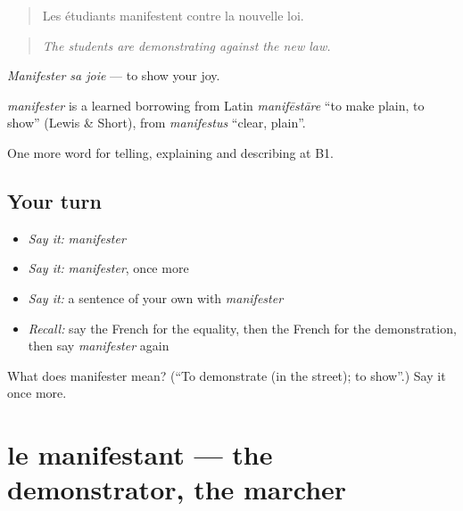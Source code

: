 \begin{quote}
Les étudiants manifestent contre la nouvelle loi.
\end{quote}

\begin{quote}
\emph{The students are demonstrating against the new law.}
\end{quote}

\emph{Manifester sa joie} — to show your joy.

\begin{cousinweb}
\emph{manifester} is a learned borrowing from Latin \emph{manifēstāre} \textquotedblleft{}to make plain, to show\textquotedblright{} (Lewis \& Short), from \emph{manifestus} \textquotedblleft{}clear, plain\textquotedblright{}.
\end{cousinweb}

\begin{grammarlens}[title={What you've built}]
One more word for telling, explaining and describing at B1.
\end{grammarlens}

\subsection*{Your turn}
\begin{itemize}
\raggedright
  \item \emph{Say it:} \emph{manifester}
  \item \emph{Say it:} \emph{manifester}, once more
  \item \emph{Say it:} a sentence of your own with \emph{manifester}
  \item \emph{Recall:} say the French for the equality, then the French for the demonstration, then say \emph{manifester} again
\end{itemize}

\begin{tcolorbox}[breakable,colback=teal!4,colframe=teal!35!black,title={Before you move on}]
What does manifester mean? (\textquotedblleft{}To demonstrate (in the street); to show\textquotedblright{}.) Say it once more.
\end{tcolorbox}
\section[le manifestant]{le manifestant — the demonstrator, the marcher}

\label{lesson:FR-C363-manifestant}



